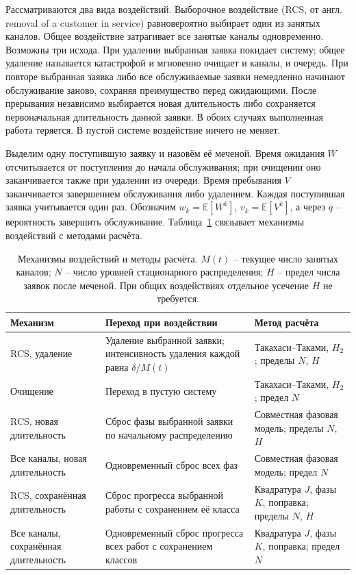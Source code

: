 \documentclass[a4paper,12pt]{article}
\begin{document}
Рассматриваются два вида воздействий. Выборочное воздействие (RCS, от англ. removal of a customer in service) равновероятно выбирает один из занятых каналов. Общее воздействие затрагивает все занятые каналы одновременно. Возможны три исхода. При удалении выбранная заявка покидает систему; общее удаление называется катастрофой и мгновенно очищает и каналы, и очередь. При повторе выбранная заявка либо все обслуживаемые заявки немедленно начинают обслуживание заново, сохраняя преимущество перед ожидающими. После прерывания независимо выбирается новая длительность либо сохраняется первоначальная длительность данной заявки. В обоих случаях выполненная работа теряется. В пустой системе воздействие ничего не меняет.

Выделим одну поступившую заявку и назовём её меченой. Время ожидания \(W\) отсчитывается от поступления до начала обслуживания; при очищении оно заканчивается также при удалении из очереди. Время пребывания \(V\) заканчивается завершением обслуживания либо удалением. Каждая поступившая заявка учитывается один раз. Обозначим \(w_k=\mathbb E[W^k]\), \(v_k=\mathbb E[V^k]\), а через \(q\) -- вероятность завершить обслуживание. Таблица~\ref{tab:methods} связывает механизмы воздействий с методами расчёта.

\begin{table}[!htbp]
\centering\small
\begin{tabular}{@{}p{3.6cm}p{6.0cm}p{5.0cm}@{}}
\toprule
Механизм & Переход при воздействии & Метод расчёта \\
\midrule
RCS, удаление & Удаление выбранной заявки; интенсивность удаления каждой равна \(\delta/M(t)\) & Такахаси--Таками, \(H_2\); пределы \(N\), \(H\) \\
Очищение & Переход в пустую систему & Такахаси--Таками, \(H_2\); предел \(N\) \\
RCS, новая длительность & Сброс фазы выбранной заявки по начальному распределению & Совместная фазовая модель; пределы \(N\), \(H\) \\
Все каналы, новая длительность & Одновременный сброс всех фаз & Совместная фазовая модель; предел \(N\) \\
RCS, сохранённая длительность & Сброс прогресса выбранной работы с сохранением её класса & Квадратура \(J\), фазы \(K\), поправка; пределы \(N\), \(H\) \\
Все каналы, сохранённая длительность & Одновременный сброс прогресса всех работ с сохранением классов & Квадратура \(J\), фазы \(K\), поправка; предел \(N\) \\
\bottomrule
\end{tabular}
\caption{Механизмы воздействий и методы расчёта. \(M(t)\) -- текущее число занятых каналов; \(N\) -- число уровней стационарного распределения; \(H\) -- предел числа заявок после меченой. При общих воздействиях отдельное усечение \(H\) не требуется.}
\label{tab:methods}
\end{table}
\end{document}
